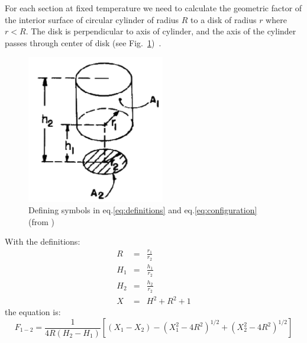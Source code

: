 For each section at fixed temperature we need to calculate the geometric factor of the interior surface of circular cylinder of radius $R$ to a disk of radius $r$ where $r < R$. The disk is perpendicular to axis of cylinder, and the axis of the cylinder passes through center of disk (see Fig.~\ref{fig:C-82fig_n})~\cite{siegel-howell-4, buschman_1961}. 
\begin{figure}[htbp]
\begin{center}
 \includegraphics[width=6cm]{Sec_SiteInfra/Cryotraps/C-82fig_n.pdf}
			\caption{Defining symbols in eq.\ref{eq:definitions} and eq.\ref{eq:configuration} (from \cite{catalog})}
\label{fig:C-82fig_n}
\end{center}
\end{figure}

With the definitions:
\begin{eqnarray}
\label{eq:definitions}
R & = & \frac{r_1}{r_2} \\
H_1 & = & \frac{h_1}{r_2} \\
H_2 & = & \frac{h_2}{r_2} \\
X & = & H^2 + R^2 + 1
\end{eqnarray}
the equation is:
\begin{equation}
\label{eq:configuration}
F_{1-2} = \frac{1}{4R(H_2-H_1)}\left[ (X_1-X_2) - (X_1^2 -4R^2)^{1/2} + (X_2^2 -4R^2)^{1/2} \right]
\end{equation}
